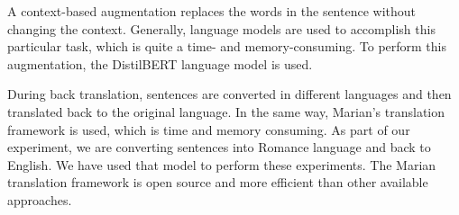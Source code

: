 \documentclass[%
	BCOR=8mm, %
	DIV=12,
	toc=bibliography, %
	toc=listof, %
	oneside, %
	egregdoesnotlikesansseriftitles, %
	]{scrbook}
\begin{document}
A context-based augmentation replaces the words in the sentence without changing the context. Generally, language models are used to accomplish this particular task, which is quite a time- and memory-consuming. To perform this augmentation, the DistilBERT language model is used.
\begin{table}[H]
    \centering
    \hspace*{-1.2em}
    \caption[Sample example of context-based augmentation]{ Sample example of context-based augmentation from IMDB dataset. }
    \label{table:conaugment}
\end{table}
During back translation, sentences are converted in different languages and then translated back to the original language. In the same way, Marian's translation framework \cite{ma_nlpaug_2022}  is used, which is time and memory consuming. As part of our experiment, we are converting sentences into Romance language and back to English. We have used that model to perform these experiments. The Marian translation framework  is open source and more efficient than other available approaches.
\end{document}
